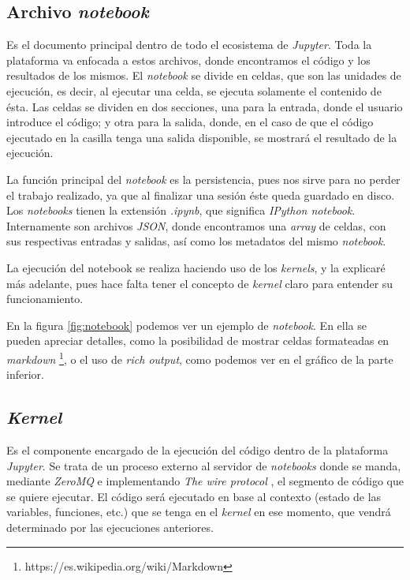 \documentclass[11pt,spanish,listoffigures]{tfgetsinf}
\begin{document}
\subsection{Archivo \textit{notebook}}
\label{subsec:estructura-notebook}

Es el documento principal dentro de todo el ecosistema de \textit{Jupyter}. Toda la plataforma va enfocada a estos archivos, donde encontramos el código y los resultados de los mismos. El \textit{notebook} se divide en celdas, que son las unidades de ejecución, es decir, al ejecutar una celda, se ejecuta solamente el contenido de ésta. Las celdas se dividen en dos secciones, una para la entrada, donde el usuario introduce el código; y otra para la salida, donde, en el caso de que el código ejecutado en la casilla tenga una salida disponible, se mostrará el resultado de la ejecución. 

La función principal del \textit{notebook} es la persistencia, pues nos sirve para no perder el trabajo realizado, ya que al finalizar una sesión éste queda guardado en disco. Los \textit{notebooks} tienen la extensión \textit{.ipynb}, que significa \textit{IPython notebook}. Internamente son archivos \textit{JSON}, donde encontramos una \textit{\gls{array}} de celdas, con sus respectivas entradas y salidas, así como los metadatos del mismo \textit{notebook}.

La ejecución del notebook se realiza haciendo uso de los \textit{kernels}, y la explicaré más adelante, pues hace falta tener el concepto de \textit{kernel} claro para entender su funcionamiento.

En la figura \ref{fig:notebook} podemos ver un ejemplo de \textit{notebook}. En ella se pueden apreciar detalles, como la posibilidad de mostrar celdas formateadas en \textit{markdown} \footnote{https://es.wikipedia.org/wiki/Markdown}, o el uso de \textit{rich output}, como podemos ver en el gráfico de la parte inferior.


\subsection{\textit{Kernel}}
\label{subsec:estructura-kernel}

Es el componente encargado de la ejecución del código dentro de la plataforma \textit{Jupyter}. Se trata de un proceso externo al servidor de \textit{notebooks} donde se manda, mediante \textit{ZeroMQ} e implementando \textit{The wire protocol} \cite{wire-protocol}, el segmento de código que se quiere ejecutar. El código será ejecutado en base al contexto (estado de las variables, funciones, etc.) que se tenga en el \textit{kernel} en ese momento, que vendrá determinado por las ejecuciones anteriores.
\end{document}
